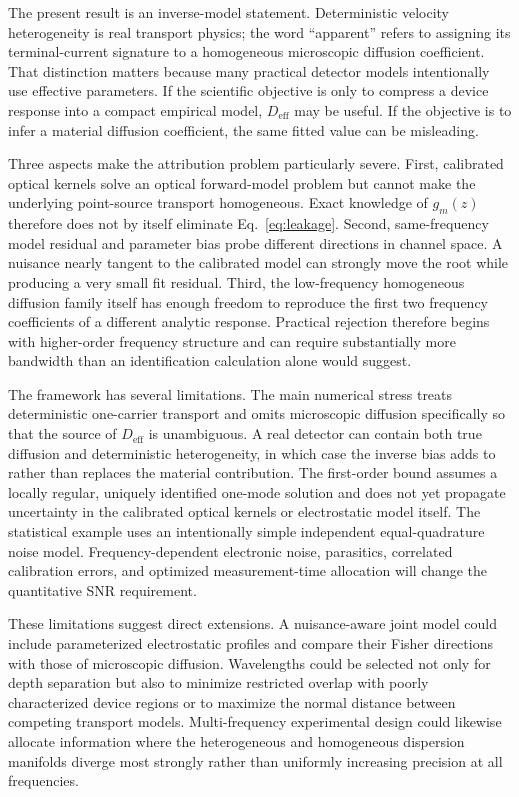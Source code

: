 \documentclass[aps,pra,twocolumn,superscriptaddress,nofootinbib]{revtex4-2}
\newcommand{\Deff}{D_{\mathrm{eff}}}
\begin{document}
The present result is an inverse-model statement. Deterministic velocity heterogeneity is real transport physics; the word ``apparent'' refers to assigning its terminal-current signature to a homogeneous microscopic diffusion coefficient. That distinction matters because many practical detector models intentionally use effective parameters. If the scientific objective is only to compress a device response into a compact empirical model, $\Deff$ may be useful. If the objective is to infer a material diffusion coefficient, the same fitted value can be misleading.

Three aspects make the attribution problem particularly severe. First, calibrated optical kernels solve an optical forward-model problem but cannot make the underlying point-source transport homogeneous. Exact knowledge of $g_m(z)$ therefore does not by itself eliminate Eq.~\eqref{eq:leakage}. Second, same-frequency model residual and parameter bias probe different directions in channel space. A nuisance nearly tangent to the calibrated model can strongly move the root while producing a very small fit residual. Third, the low-frequency homogeneous diffusion family itself has enough freedom to reproduce the first two frequency coefficients of a different analytic response. Practical rejection therefore begins with higher-order frequency structure and can require substantially more bandwidth than an identification calculation alone would suggest.

The framework has several limitations. The main numerical stress treats deterministic one-carrier transport and omits microscopic diffusion specifically so that the source of $\Deff$ is unambiguous. A real detector can contain both true diffusion and deterministic heterogeneity, in which case the inverse bias adds to rather than replaces the material contribution. The first-order bound assumes a locally regular, uniquely identified one-mode solution and does not yet propagate uncertainty in the calibrated optical kernels or electrostatic model itself. The statistical example uses an intentionally simple independent equal-quadrature noise model. Frequency-dependent electronic noise, parasitics, correlated calibration errors, and optimized measurement-time allocation will change the quantitative SNR requirement.

These limitations suggest direct extensions. A nuisance-aware joint model could include parameterized electrostatic profiles and compare their Fisher directions with those of microscopic diffusion. Wavelengths could be selected not only for depth separation but also to minimize restricted overlap with poorly characterized device regions or to maximize the normal distance between competing transport models. Multi-frequency experimental design could likewise allocate information where the heterogeneous and homogeneous dispersion manifolds diverge most strongly rather than uniformly increasing precision at all frequencies.
\end{document}
